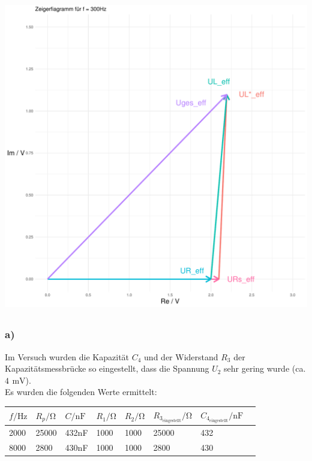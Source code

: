 \documentclass[a4paper, 12pt]{article}
\begin{document}
  \subsection{}
    \begin{center}
      \includegraphics[scale=0.5]{./R/Ortskurve/ZeigerbildSpannung.pdf}
    \end{center}

  \subsection{}
    \subsubsection*{a)}
      Im Versuch wurden die Kapazität $C_4$ und der Widerstand $R_3$ der Kapazitätsmessbrücke so eingestellt, dass die Spannung $U_2$ sehr gering wurde (ca. $4 \,\ \si{\milli\volt}$).\\
      Es wurden die folgenden Werte ermittelt:
      \begin{table}[H]
        \begin{center}
          \begin{tabular}{@{}llllllll@{}}
          \toprule
          $f / \si{\hertz}$    & $R_p / \si{\ohm}$    & $C / \si{\nano\farad}$     & $R_1 / \si{\ohm}$   & $R_2 / \si{\ohm}$   & $R_{3_{\text{eingestellt}}} / \si{\ohm}$ & $C_{4_{\text{eingestellt}}} / \si{\nano\farad}$    \\ \midrule
          2000 & 25000 & 432nF & 1000 & 1000 & 25000     & 432  \\
          8000 & 2800  & 430nF & 1000 & 1000 & 2800      & 430  \\ \bottomrule
          \end{tabular}
        \end{center}
      \end{table}
\end{document}

